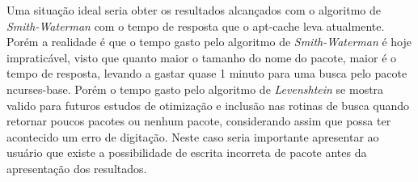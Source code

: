Uma situação ideal seria obter os resultados alcançados com o algoritmo de \textit{Smith-Waterman} com o tempo de resposta que o {\code apt-cache} leva atualmente. Porém a realidade é que o tempo gasto pelo algoritmo de \textit{Smith-Waterman} é hoje impraticável, visto que quanto maior o tamanho do nome do pacote, maior é o tempo de resposta, levando a gastar quase 1 minuto para uma busca pelo pacote {\code ncurses-base}. Porém o tempo gasto pelo algoritmo de 
\textit{Levenshtein} se mostra valido para futuros estudos de otimização e inclusão nas rotinas de busca quando retornar poucos pacotes ou nenhum pacote, considerando assim que possa ter acontecido um erro de digitação. Neste caso seria importante apresentar ao usuário que existe a possibilidade de escrita incorreta de pacote antes da apresentação dos resultados.